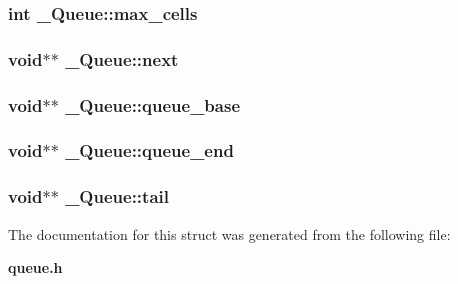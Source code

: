 \subsubsection{\setlength{\rightskip}{0pt plus 5cm}int \bf{\_\-Queue::max\_\-cells}}\label{struct__Queue_a12e232ad20a4f1b78f60edd36425de7}


\subsubsection{\setlength{\rightskip}{0pt plus 5cm}void$\ast$$\ast$ \bf{\_\-Queue::next}}\label{struct__Queue_1eed68709f0f11cfbb083b4bb53630e1}


\subsubsection{\setlength{\rightskip}{0pt plus 5cm}void$\ast$$\ast$ \bf{\_\-Queue::queue\_\-base}}\label{struct__Queue_a7c54852d04b9ea8e70ead173c13d36e}


\subsubsection{\setlength{\rightskip}{0pt plus 5cm}void$\ast$$\ast$ \bf{\_\-Queue::queue\_\-end}}\label{struct__Queue_8d13abeb1b6ec667b6c55b808b2e67f9}


\subsubsection{\setlength{\rightskip}{0pt plus 5cm}void$\ast$$\ast$ \bf{\_\-Queue::tail}}\label{struct__Queue_cfe98db7b517d63448dfa206c77c821d}




The documentation for this struct was generated from the following file:\begin{CompactItemize}
\item 
\bf{queue.h}\end{CompactItemize}
